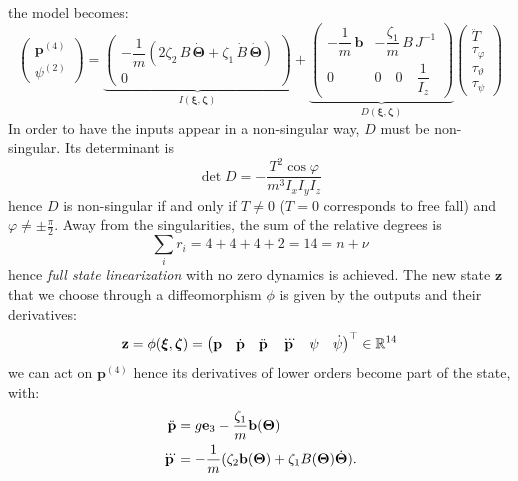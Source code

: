 \documentclass[10pt, a4paper]{report}
\begin{document}
the model becomes:\begin{equation}
    \begin{pmatrix}
\mathbf p^{(4)} \\
\psi^{(2)}
\end{pmatrix}
=
\underbrace{
\begin{pmatrix}
-\dfrac{1}{m}\left( 2\zeta_2\,B\,\dot{\boldsymbol{\Theta}} + \zeta_1\,\dot{B}\,\dot{\boldsymbol{\Theta}} \right) \\
0
\end{pmatrix}
}_{I(\boldsymbol{\xi}, \boldsymbol{\zeta})}
+
\underbrace{
\begin{pmatrix}
-\dfrac{1}{m}\,\mathbf b & -\dfrac{\zeta_1}{m}\,B\,J^{-1} \\
0 & 0\quad 0\quad \dfrac{1}{I_z}
\end{pmatrix}
}_{D(\boldsymbol{\xi}, \boldsymbol{\zeta})}
\begin{pmatrix}
\ddot{T} \\
\tau_\varphi \\
\tau_\vartheta \\
\tau_\psi
\end{pmatrix}
\end{equation}
In order to have the inputs appear in a non-singular way, $D$ must be non-singular. Its determinant is\begin{equation}
    \det D=-\frac{T^2\cos\varphi}{m^3I_xI_yI_z}
\end{equation}
hence $D$ is non-singular if and only if $T\ne0$ ($T=0$ corresponds to free fall) and $\varphi\ne \pm\frac{\pi}{2}$. Away from the singularities, the sum of the relative degrees is\begin{equation}
    \sum_ir_i = 4+4+4+2=14=n+\nu  
\end{equation}
hence \textit{full state linearization} with no zero dynamics is achieved. 
The new state $\mathbf z$ that we choose through a diffeomorphism $\phi$ is given by the outputs and their derivatives:\begin{equation}
    \mathbf z=\phi({\boldsymbol{\xi}},{\boldsymbol{\zeta}})=\begin{pmatrix}
        \mathbf p&
        \dot{\mathbf p}&
        \ddot{\mathbf p}&
        \dddot{\mathbf p}&
        \psi&\dot\psi
    \end{pmatrix}^\top\in{\mathbb R}^{14}
\end{equation}
we can act on $\mathbf p^{(4)}$ hence its derivatives of lower orders become part of the state, with:\begin{align}
    \ddot{\mathbf p}&=g\mathbf e_3-\frac{\zeta_1}{m}\mathbf b({\boldsymbol{\Theta}})\\
     \dddot{\mathbf p}&=-\frac{1}{m}(\zeta_2\mathbf b({\boldsymbol{\Theta}})+\zeta_1B({\boldsymbol{\Theta}})\dot{{\boldsymbol{\Theta}}}).
\end{align}
\end{document}
